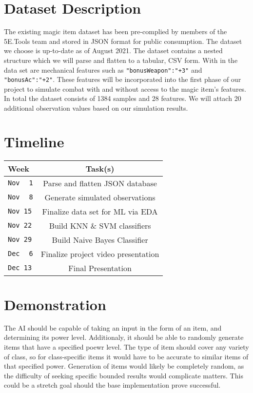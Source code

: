 \documentclass[12pt]{diazessay}
\begin{document}
\section*{Dataset Description}

The existing magic item dataset \cite{Mirror5eTools} has been pre-complied by members of the 5E.Tools team and stored in JSON format for public consumption.
The dataset we choose is up-to-date as of August 2021.
The dataset contains a nested structure which we will parse and flatten to a tabular, CSV form.
With in the data set are mechanical features such as \texttt{"bonusWeapon":"+3"} and \texttt{"bonusAc":"+2"}.
These features will be incorporated into the first phase of our project to simulate combat with and without access to the magic item's features.
In total the dataset consists of 1384 samples and 28 features.
We will attach 20 additional observation values based on our simulation results.


\section*{Timeline}


\begin{tabular}{ |l|c| }
	\hline
	Week & Task(s) \\ \hline
	\texttt{Nov $\,$ 1} & Parse and flatten JSON database  \\
	\texttt{Nov $\,$ 8} & Generate simulated observations  \\
	\texttt{Nov     15} & Finalize data set for ML via EDA \\
	\texttt{Nov     22} & Build KNN \& SVM classifiers \\
	\texttt{Nov     29} & Build Naive Bayes Classifier \\
	\texttt{Dec $\,$ 6} & Finalize project video presentation \\
	\texttt{Dec     13} & Final Presentation \\
	\hline
\end{tabular}


\section*{Demonstration}

The AI should be capable of taking an input in the form of an item, and determining its power level.
Additionaly, it should be able to randomly generate items that have a specified poewr level.
The type of item should cover any variety of class, so for class-specific items it would have to be accurate to similar items of that specified power.
Generation of items would likely be completely random, as the difficulty of seeking specific bounded results would complicate matters.
This could be a stretch goal should the base implementation prove successful.
\end{document}
